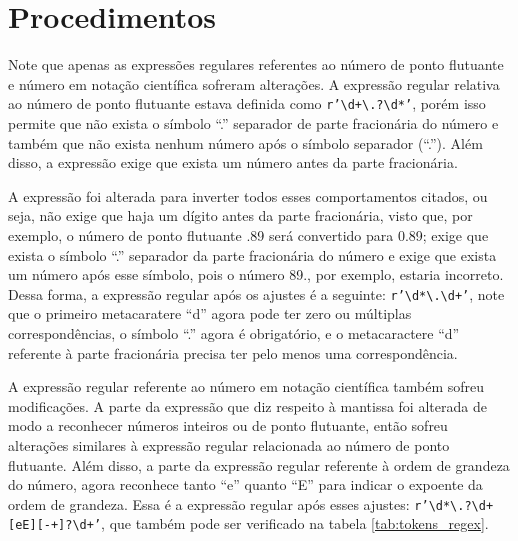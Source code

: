 \documentclass[
	12pt,				%
	oneside,   	        %
	a4paper,			%
	english,			%
	french,				%
	spanish,			%
	brazilian,				%
	]{pacotes/abntex2}
\begin{document}
\section{Procedimentos}
\label{sec:procedimentos}

Note que apenas as expressões regulares referentes ao número de ponto flutuante e número em notação científica sofreram alterações. A expressão regular relativa ao número de ponto flutuante estava definida como \texttt{r'\textbackslash d+\textbackslash.?\textbackslash d*'}, porém isso permite que não exista o símbolo ``.'' separador de parte fracionária do número e também que não exista nenhum número após o símbolo separador (``.''). Além disso, a expressão exige que exista um número antes da parte fracionária. 

A expressão foi alterada para inverter todos esses comportamentos citados, ou seja, não exige que haja um dígito antes da parte fracionária, visto que, por exemplo, o número de ponto flutuante .89 será convertido para 0.89; exige que exista o símbolo ``.'' separador da parte fracionária do número e exige que exista um número após esse símbolo, pois o número 89., por exemplo, estaria incorreto. Dessa forma, a expressão regular após os ajustes é a seguinte: \texttt{r'\textbackslash d*\textbackslash.\textbackslash d+'}, note que o primeiro metacaratere ``d'' agora pode ter zero ou múltiplas correspondências, o símbolo ``.'' agora é obrigatório, e o metacaractere ``d'' referente à parte fracionária precisa ter pelo menos uma correspondência.

A expressão regular referente ao número em notação científica também sofreu modificações. A parte da expressão que diz respeito à mantissa foi alterada de modo a reconhecer números inteiros ou de ponto flutuante, então sofreu alterações similares à expressão regular relacionada ao número de ponto flutuante. Além disso, a parte da expressão regular referente à ordem de grandeza do número, agora reconhece tanto ``e'' quanto ``E'' para indicar o expoente da ordem de grandeza. Essa é a expressão regular após esses ajustes: \texttt{r'\textbackslash d*\textbackslash.?\textbackslash d+[eE][-+]?\textbackslash d+'}, que também pode ser verificado na tabela \ref{tab:tokens_regex}.

\postextual
\renewcommand{\bibsection}{%
\section{\bibname}
\bibmark
\prebibhook}


\end{document}
